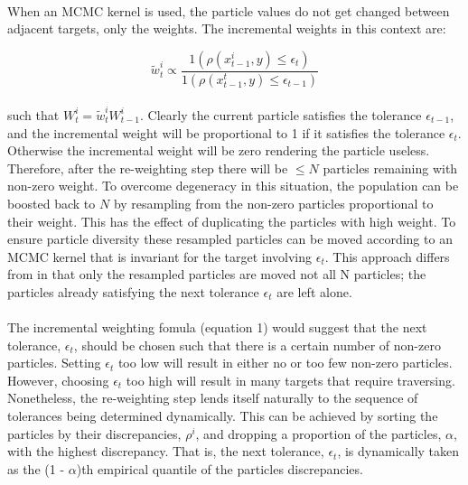 \documentclass[12,fleqn]{article}
\theoremstyle{definition}
\theoremstyle{plain}
\begin{document}
\paragraph{}
When an MCMC kernel is used, the particle values do not get changed between adjacent targets, only the weights. The incremental weights in this context are:
\par
\begin{equation}
\tilde{w}^i_t  \propto \frac{1(\rho(x^i_{t-1}, y) \leq \epsilon_t)}{1(\rho(x^t_{t - 1}, y) \leq \epsilon_{t - 1})}
\end{equation}
\paragraph{}
such that $W^i_t = \tilde{w}^i_tW^i_{t-1}$. Clearly the current particle satisfies the tolerance $\epsilon_{t-1}$, and the incremental weight will be proportional to 1 if it satisfies the tolerance $\epsilon_t$. Otherwise the incremental weight will be zero rendering the particle useless. Therefore, after the re-weighting step there will be $\leq N$ particles remaining with non-zero weight. To overcome degeneracy in this situation, the population can be boosted back to $N$ by resampling from the non-zero particles proportional to their weight. This has the effect of duplicating the particles with high weight. To ensure particle diversity these resampled particles can be moved according to an MCMC kernel that is invariant for the target involving $\epsilon_t$. This approach differs from  in that only the resampled particles are moved not all N particles; the particles already satisfying the next tolerance $\epsilon_t$ are left alone.   
\par
\paragraph{}
The incremental weighting fomula (equation 1) would suggest that the next tolerance, $\epsilon_t$, should be chosen such that there is a certain number of non-zero particles. Setting  $\epsilon_t$  too low will result in either no or too few non-zero particles. However, choosing  $\epsilon_t$ too high will result in many targets that require traversing. Nonetheless, the re-weighting step lends itself naturally to the sequence of tolerances being determined dynamically. This can be achieved by sorting the particles by their discrepancies, $\rho^i$, and dropping a proportion of the particles, $\alpha$, with the highest discrepancy. That is, the next tolerance,  $\epsilon_t$, is dynamically taken as the (1 - $\alpha$)th empirical quantile of the particles discrepancies.  
\par
\end{document}
